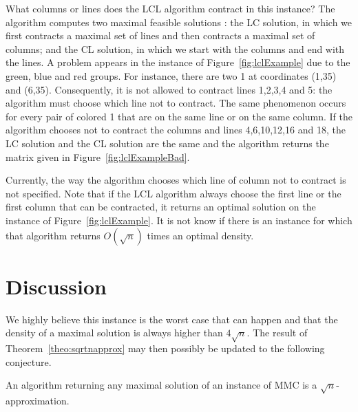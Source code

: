 What columns or lines does the LCL algorithm contract in this instance? The algorithm computes two maximal feasible solutions : the LC solution, in which we first contracts a maximal set of lines and then contracts a maximal set of columns; and the CL solution, in which we start with the columns and end with the lines. A problem appears in the instance of Figure~\ref{fig:lclExample} due to the green, blue and red groups. For instance, there are two 1 at coordinates (1,35) and (6,35). Consequently, it is not allowed to contract lines 1,2,3,4 and 5: the algorithm must choose which line not to contract. The same phenomenon occurs for every pair of colored 1 that are on the same line or on the same column. If the algorithm chooses not to contract the columns and lines 4,6,10,12,16 and 18, the LC solution and the CL solution are the same and the algorithm returns the matrix given in Figure~\ref{fig:lclExampleBad}.

\begin{remark}
	Currently, the way the algorithm chooses which line of column not to contract is not specified. Note that if the LCL algorithm always choose the first line or the first column that can be contracted, it returns an optimal solution on the instance of Figure~\ref{fig:lclExample}. It is not know if there is an instance for which that algorithm returns $O(\sqrt{n})$ times an optimal density. 
\end{remark}





\section{Discussion}

We highly believe this instance is the worst case that can happen and that the density of a maximal solution is always higher than $4\sqrt{n}$. The result of Theorem~\ref{theo:sqrtnapprox} may then possibly be updated to the following conjecture. 

\begin{conjecture}
	An algorithm returning any maximal solution of an instance of MMC is a $\sqrt{n}$-approximation.
\end{conjecture}